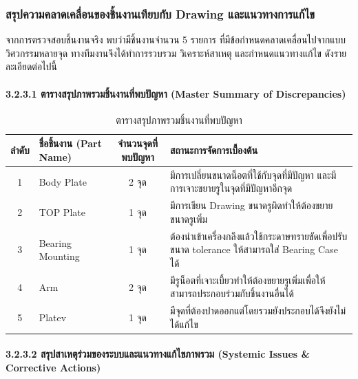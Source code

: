 \subsubsection{สรุปความคลาดเคลื่อนของชิ้นงานเทียบกับ Drawing และแนวทางการแก้ไข}
\label{subsubsec:part_discrepancy_summary}

จากการตรวจสอบชิ้นงานจริง พบว่ามีชิ้นงานจำนวน 5 รายการ ที่มีข้อกำหนดคลาดเคลื่อนไปจากแบบวิศวกรรมหลายจุด ทางทีมงานจึงได้ทำการรวบรวม วิเคราะห์สาเหตุ และกำหนดแนวทางแก้ไข ดังรายละเอียดต่อไปนี้

\paragraph{3.2.3.1 ตารางสรุปภาพรวมชิ้นงานที่พบปัญหา (Master Summary of Discrepancies)}
\label{par:master_summary_discrepancies}

\begin{table}[H]
    \centering
    \caption{ตารางสรุปภาพรวมชิ้นงานที่พบปัญหา}
    \label{tab:discrepancy_summary}
    \begin{tabular}{clcp{7cm}}
        \toprule
        \textbf{ลำดับ} & \textbf{ชื่อชิ้นงาน (Part Name)} & \textbf{จำนวนจุดที่พบปัญหา} & \textbf{สถานะการจัดการเบื้องต้น} \\
        \midrule
        1 & Body Plate & 2 จุด & มีการเปลี่ยนขนาดน็อตที่ใช้กับจุดที่มีปัญหา และมีการเจาะขยายรูในจุดที่มีปัญหาอีกจุด \\
        2 & TOP Plate & 1 จุด & มีการเขียน Drawing ขนาดรูผิดทำให้ต้องขยายขนาดรูเพิ่ม \\
        3 & Bearing Mounting & 1 จุด & ต้องนำเข้าเครื่องกลึงแล้วใช้กระดาษทรายขัดเพื่อปรับขนาด tolerance ให้สามารถใส่ Bearing Case ได้ \\
        4 & Arm & 2 จุด & มีรูน็อตที่เจาะเบี้ยวทำให้ต้องขยายรูเพิ่มเพื่อให้สามารถประกอบร่วมกับชิ้นงานอื่นได้ \\
        5 & Platev & 1 จุด & มีจุดที่ต้องปาดออกแต่โดยรวมยังประกอบได้จึงยังไม่ได้แก้ไข \\
        \bottomrule
    \end{tabular}
\end{table}

\paragraph{3.2.3.2 สรุปสาเหตุร่วมของระบบและแนวทางแก้ไขภาพรวม (Systemic Issues \& Corrective Actions)}
\label{par:systemic_issues_corrective_actions}

